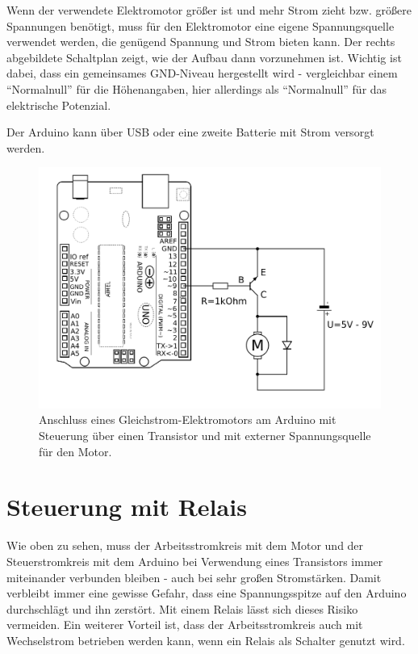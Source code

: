 \begin{minipage}{0.5\textwidth}
	Wenn der verwendete Elektromotor größer ist und mehr Strom zieht bzw. größere Spannungen benötigt, muss für den Elektromotor eine eigene Spannungsquelle verwendet werden, die genügend Spannung und Strom bieten kann. Der rechts abgebildete Schaltplan zeigt, wie der Aufbau dann vorzunehmen ist. Wichtig ist dabei, dass ein gemeinsames GND-Niveau hergestellt wird - vergleichbar einem \enquote{Normalnull} für die Höhenangaben, hier allerdings als \enquote{Normalnull} für das elektrische Potenzial.
	
	Der Arduino kann über USB oder eine zweite Batterie mit Strom versorgt werden.
\end{minipage}
\hfill
\begin{minipage}{0.48\textwidth}
	\begin{figure}[H]
		\centering
		\includegraphics[width=\textwidth]{./Zeichnungen/Schaltplan-Motoranschluss-ext-Spannung.png}
		\caption{Anschluss eines Gleichstrom-Elektromotors am Arduino mit Steuerung über einen Transistor und mit externer Spannungsquelle für den Motor.}
	\end{figure}
\end{minipage}

\newpage
\section{Steuerung mit Relais}

Wie oben zu sehen, muss der Arbeitsstromkreis mit dem Motor und der Steuerstromkreis mit dem Arduino bei Verwendung eines Transistors immer miteinander verbunden bleiben - auch bei sehr großen Stromstärken. Damit verbleibt immer eine gewisse Gefahr, dass eine Spannungsspitze auf den Arduino durchschlägt und ihn zerstört. Mit einem Relais lässt sich dieses Risiko vermeiden. Ein weiterer Vorteil ist, dass der Arbeitsstromkreis auch mit Wechselstrom betrieben werden kann, wenn ein Relais als Schalter genutzt wird.

